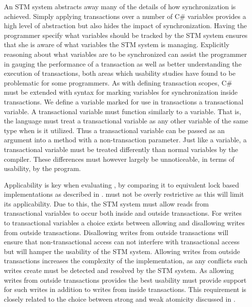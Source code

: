 An \ac{STM} system abstracts away many of the details of how synchronization is achieved. Simply applying transactions over a number of C\# variables provides a high level of abstraction but also hides the impact of synchronization. Having the programmer specify what variables should be tracked by the \ac{STM} system ensures that she is aware of what variables the \ac{STM} system is managing. Explicitly reasoning about what variables are to be synchronized can assist the programmer in gauging the performance of a transaction as well as better understanding the execution of transactions, both areas which usability studies\cite{rossbach2010transactional}\cite{pankratius2009does} have found to be problematic for some programmers. As with defining transaction scopes, C\# must be extended with syntax for marking variables for synchronization inside transactions.  We define a variable marked for use in transactions a transactional variable. A transactional variable must function similarly to a  variable. That is, the language must treat a transactional variable as any other variable of the same type when is it utilized. Thus a transactional variable can be passed as an argument into a method with a non-transaction parameter. Just like a  variable, a transactional variable must be treated differently than normal variables by the compiler. These differences must however largely be unnoticeable, in terms of usability, by the program.

Applicability is key when evaluating \stmname, by comparing it to equivalent lock based implementations as described in . \stmnamesp must not be overly restrictive as this will limit its applicability. Due to this, the \ac{STM} system must allow reads from transactional variables to occur both inside and outside transactions. For writes to transactional variables a choice exists between allowing and disallowing writes from outside transactions. Disallowing writes from outside transactions will ensure that non-transactional access can not interfere with transactional access but will hamper the usability of the \ac{STM} system. Allowing writes from outside transactions increases the complexity of the implementation, as any conflicts such writes create must be detected and resolved by the \ac{STM} system. As allowing writes from outside transactions provides the best usability \stmnamesp must provide support for such writes in addition to writes from inside transactions. This requirement is closely related to the choice between strong and weak atomicity discussed in .

